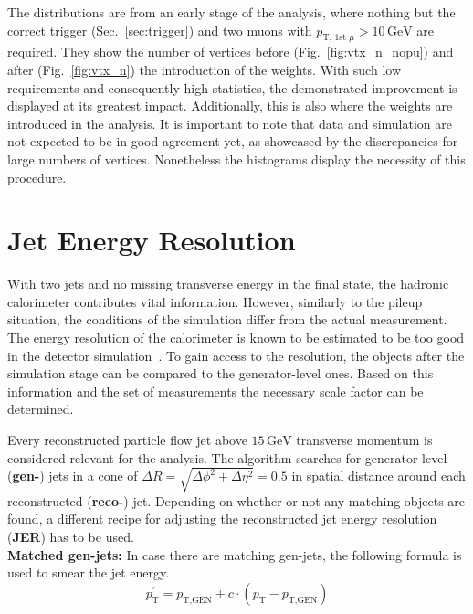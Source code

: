 {\noindent The distributions are from an early stage of the analysis, where nothing but the correct trigger (Sec.~\ref{sec:trigger}) and two muons with $p_{\text{T, 1st }\mu} > 10\,\text{GeV}$ are required. They show the number of vertices before (Fig.~\ref{fig:vtx_n_nopu}) and after (Fig.~\ref{fig:vtx_n}) the introduction of the weights. With such low requirements and consequently high statistics, the demonstrated improvement is displayed at its greatest impact. Additionally, this is also where the weights are introduced in the analysis. It is important to note that data and simulation are not expected to be in good agreement yet, as showcased by the discrepancies for large numbers of vertices. Nonetheless the histograms display the necessity of this procedure.


\section{Jet Energy Resolution}
\label{sec:jer}

With two jets and no missing transverse energy in the final state, the hadronic calorimeter contributes vital information. However, similarly to the pileup situation, the conditions of the simulation differ from the actual measurement. The energy resolution of the calorimeter is known to be estimated to be too good in the detector simulation~\cite{jer}. To gain access to the resolution, the objects after the simulation stage can be compared to the generator-level ones. Based on this information and the set of measurements the necessary scale factor can be determined.

Every reconstructed particle flow jet above $15\,\text{GeV}$ transverse momentum is considered relevant for the analysis. The algorithm searches for generator-level (\textbf{gen-}) jets in a cone of $\Delta R = \sqrt{\Delta\phi^2 + \Delta\eta^2} = 0.5$ in spatial distance around each reconstructed (\textbf{reco-}) jet. Depending on whether or not any matching objects are found, a different recipe for adjusting the reconstructed jet energy resolution (\textbf{JER}) has to be used. \\


\textbf{Matched gen-jets:} In case there are matching gen-jets, the following formula is used to smear the jet energy.
\begin{equation}
  \label{eq:jermatched}
  p^\prime_{\text{T}} = p_{\text{T}, \text{GEN}} + c \cdot (p_{\text{T}} - p_{\text{T}, \text{GEN}})
\end{equation}
  
}
